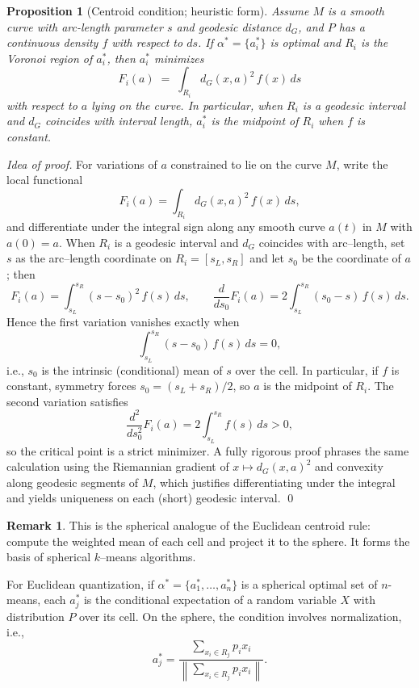 \documentclass[12pt, reqno]{amsart}
\theoremstyle{plain}
\newtheorem{proposition}[subsection]{Proposition}
\theoremstyle{definition}
\newtheorem{remark}[subsection]{Remark}
\begin{document}
\begin{proposition}[Centroid condition; heuristic form]\label{prop:centroid}
Assume $M$ is a smooth curve with arc-length parameter $s$ and geodesic distance $d_G$, and $P$ has a continuous density $f$ with respect to $ds$. If $\alpha^\ast=\{a_i^\ast\}$ is optimal and $R_i$ is the Voronoi region of $a_i^\ast$, then $a_i^\ast$ minimizes
\[
F_i(a)\;=\; \int_{R_i} d_G(x,a)^2\, f(x)\, ds
\]
with respect to $a$ lying on the curve. In particular, when $R_i$ is a geodesic interval and $d_G$ coincides with interval length, $a_i^\ast$ is the \emph{midpoint} of $R_i$ when $f$ is constant.
\end{proposition}
\emph{Idea of proof.}
For variations of $a$ constrained to lie on the curve $M$, write the local functional
\[
F_i(a)=\int_{R_i} d_G(x,a)^2\,f(x)\,ds,
\]
and differentiate under the integral sign along any smooth curve $a(t)$ in $M$ with $a(0)=a$.
When $R_i$ is a geodesic interval and $d_G$ coincides with arc–length, set $s$ as the arc–length
coordinate on $R_i=[s_L,s_R]$ and let $s_0$ be the coordinate of $a$; then
\[
F_i(a)=\int_{s_L}^{s_R} (s-s_0)^2\,f(s)\,ds,\qquad
\frac{d}{ds_0}F_i(a) = 2\!\int_{s_L}^{s_R} (s_0-s)\,f(s)\,ds.
\]
Hence the first variation vanishes exactly when
\[
\int_{s_L}^{s_R} (s-s_0)\,f(s)\,ds=0,
\]
i.e., $s_0$ is the intrinsic (conditional) mean of $s$ over the cell. In particular, if $f$ is constant,
symmetry forces $s_0=(s_L+s_R)/2$, so $a$ is the midpoint of $R_i$. The second variation satisfies
\[
\frac{d^2}{ds_0^2}F_i(a)=2\int_{s_L}^{s_R}f(s)\,ds>0,
\]
so the critical point is a strict minimizer. A fully rigorous proof phrases the same calculation using the
Riemannian gradient of $x\mapsto d_G(x,a)^2$ and convexity along geodesic segments of $M$, which
justifies differentiating under the integral and yields uniqueness on each (short) geodesic interval. \qed


\begin{remark}
This is the spherical analogue of the Euclidean centroid rule: compute the weighted mean of each cell and project it to the sphere.  It forms the basis of spherical $k$--means algorithms.
\end{remark}

For Euclidean quantization, if $\alpha^*=\{a_1^*,\dots,a_n^*\}$ is a spherical optimal set of $n$-means, each $a_j^*$ is the conditional expectation of a random variable $X$ with distribution $P$ over its cell. On the sphere, the condition involves normalization, i.e., 
\begin{equation}\label{eq:centroid}
a_j^* = 
\frac{\sum_{x_i\in R_j} p_i x_i}
{\left\|\sum_{x_i\in R_j} p_i x_i\right\|}.
\end{equation}
 
\end{document}
